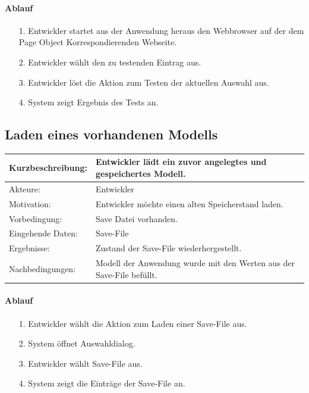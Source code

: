 \paragraph{Ablauf}

\begin{itemize}[itemsep=0pt]
\item[1.] Entwickler startet aus der Anwendung heraus den Webbrowser auf der dem Page Object Korrespondierenden Webseite. 
\item[2.] Entwickler wählt den zu testenden Eintrag aus.
\item[3.] Entwickler löst die Aktion zum Testen der aktuellen Auswahl aus. 
\item[4.] System zeigt Ergebnis des Tests an.
\end{itemize}


\subsection{Laden eines vorhandenen Modells}
\label{sec:load}

\begin{tabular}[h]{|p{4cm}|p{}|}
\hline 
\rule[-1ex]{0pt}{2.5ex}Kurzbeschreibung: & 
Entwickler lädt ein zuvor angelegtes und gespeichertes Modell. \\  
\hline 
\rule[-1ex]{0pt}{2.5ex}Akteure: & 
Entwickler \\ 
\hline 
\rule[-1ex]{0pt}{2.5ex}Motivation: & 
Entwickler möchte einen alten Speicherstand laden. \\ 
\hline 
\rule[-1ex]{0pt}{2.5ex}Vorbedingung: & 
Save Datei vorhanden. \\ 
\hline 
\rule[-1ex]{0pt}{2.5ex}Eingehende Daten: & Save-File\\ 
\hline 
\rule[-1ex]{0pt}{2.5ex}Ergebnisse: & Zustand der Save-File wiederhergestellt. \\ 
\hline 
\rule[-1ex]{0pt}{2.5ex}Nachbedingungen: & Modell der Anwendung wurde mit den Werten aus der Save-File befüllt.  \\ 
\hline 
\end{tabular} 

\paragraph{Ablauf}

\begin{itemize}[itemsep=0pt]
\item[1.] Entwickler wählt die Aktion zum Laden einer Save-File aus.
\item[2.] System öffnet Auswahldialog. 
\item[3.] Entwickler wählt Save-File aus.
\item[4.] System zeigt die Einträge der Save-File an.
\end{itemize}

